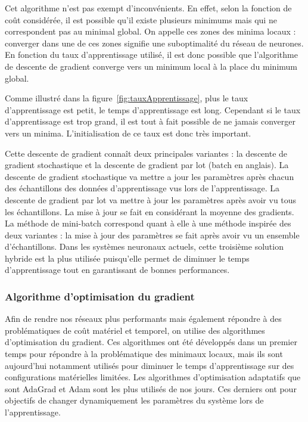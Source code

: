 Cet algorithme n'est pas exempt d'inconvénients. En effet, selon la fonction de coût considérée, il est possible qu'il existe plusieurs minimums mais qui ne correspondent pas au minimal global. On appelle ces zones des minima locaux : converger dans une de ces zones signifie une suboptimalité du réseau de neurones. En fonction du taux d'apprentissage utilisé, il est donc possible que l'algorithme de descente de gradient converge vers un minimum local à la place du minimum global.

Comme illustré dans la figure~\ref{fig:tauxApprentissage}, plus le taux d'apprentissage est petit, le temps d'apprentissage est long. Cependant si le taux d'apprentissage est trop grand, il est tout à fait possible de ne jamais converger vers un minima. L'initialisation de ce taux est donc très important.

Cette descente de gradient connaît deux principales variantes : la descente de gradient stochastique et la descente de gradient par lot (batch en anglais). La descente de gradient stochastique va mettre a jour les paramètres après chacun des échantillons des données d'apprentissage vus lors de l'apprentissage. La descente de gradient par lot va mettre à jour les paramètres après avoir vu tous les échantillons. La mise à jour se fait en considérant la moyenne des gradients. La méthode de mini-batch correspond quant à elle à une méthode inspirée des deux variantes : la mise à jour des paramètres se fait après avoir vu un ensemble d'échantillons.
Dans les systèmes neuronaux actuels, cette troisième solution hybride est la plus utilisée puisqu'elle permet de diminuer le temps d'apprentissage tout en garantissant de bonnes performances.


\subsubsection{Algorithme d'optimisation du gradient}
Afin de rendre nos réseaux plus performants mais également répondre à des problématiques de coût matériel et temporel, on utilise des algorithmes d'optimisation du gradient. Ces algorithmes ont été développés dans un premier temps pour répondre à la problématique des minimaux locaux, mais ils sont aujourd'hui notamment utilisés pour diminuer le temps d'apprentissage sur des configurations matérielles limitées.
Les algorithmes d'optimisation adaptatifs que sont AdaGrad et Adam sont les plus utilisés de nos jours. Ces derniers ont pour objectifs de changer dynamiquement les paramètres du système lors de l'apprentissage.

